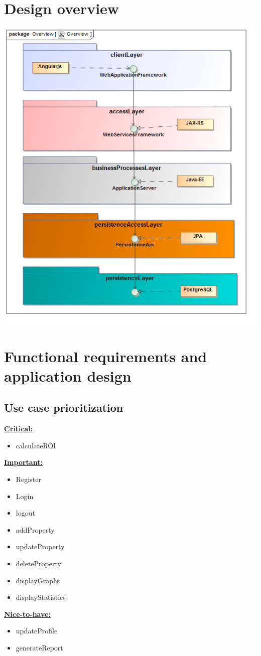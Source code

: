 \documentclass[a4paper,12pt]{article}
\begin{document}
\section{Design overview}
\includegraphics[width=1\textwidth]{./Images/Overview.png}

\newpage
\section{Functional requirements and application design}

\subsection{Use case prioritization}
 \underline{\textbf{Critical:}}
	\begin{itemize}
		\item calculateROI
	\end{itemize}
\underline{\textbf{Important:}}
	\begin{itemize}
		\item Register
		\item Login
		\item logout
		\item addProperty
		\item updateProperty	
		\item deleteProperty
		\item displayGraphs
		\item displayStatistics	
	\end{itemize}
\underline{\textbf{Nice-to-have:}}
	\begin{itemize}
		\item updateProfile
		\item generateReport	
	\end{itemize}
\end{document}
